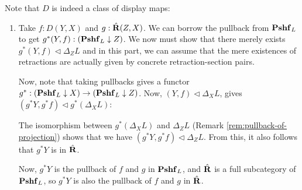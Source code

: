 Note that $ D $ is indeed a class of display maps:
\begin{enumerate}
  \item Take $ f : D(Y, X) $ and $ g: \hat {\mathbf{R}}(Z, X) $. We can borrow the pullback from $ \mathbf{Pshf}_{L} $ to get $ g^*(Y, f) : (\mathbf{Pshf}_{L} \downarrow Z) $. We now must show that there merely exists $ g^* (Y, f) \triangleleft \Delta_Z L $ and in this part, we can assume that the mere existences of retractions are actually given by concrete retraction-section pairs.

    Now, note that taking pullbacks gives a functor $ g^* : (\mathbf{Pshf}_{L} \downarrow X) \to (\mathbf{Pshf}_{L} \downarrow Z) $. Now, $ (Y, f) \triangleleft \Delta_X L $, gives $ (g^*Y, g^*f) \triangleleft g^*(\Delta_X L) $:
    \begin{center}
    \end{center}
    The isomorphism between $ g^*(\Delta_X L) $ and $ \Delta_Z L $ (Remark \ref{rem:pullback-of-projection}) shows that we have $ (g^*Y, g^*f) \triangleleft \Delta_Z L $. From this, it also follows that $ g^* Y $ is in $ \hat {\mathbf{R}} $.

    Now, $ g^*Y $ is the pullback of $ f $ and $ g $ in $ \mathbf{Pshf}_{L} $, and $ \hat {\mathbf{R}} $ is a full subcategory of $ \mathbf{Pshf}_{L} $, so $ g^* Y $ is also the pullback of $ f $ and $ g $ in $ \hat {\mathbf{R}} $.


\end{enumerate}
